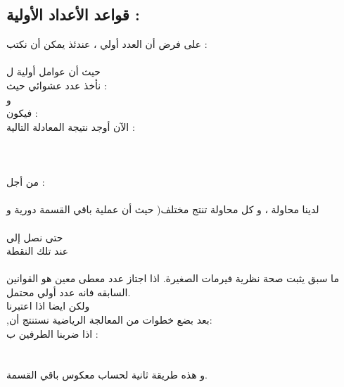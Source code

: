 \documentclass[11pt,a4paper]{report}
\begin{document}
\begin{otherlanguage}{arabic}
\chapter{قواعد الأعداد الأولية :}
\begin{otherlanguage}{arabic}
\begin{center}
على فرض أن العدد  أولي ، عندئذ يمكن أن نكتب :
\\
\textit{}
\\
حيث أن  عوامل أولية ل 
\\
نأخذ عدد عشوائي  حيث :
\\
  و 
\\
فيكون : 
\\
الآن أوجد نتيجة المعادلة التالية :
\\
\\
\\
\\
من أجل :
\\
\\
لدينا   محاولة ، و كل محاولة تنتج  مختلف( حيث أن عملية باقي القسمة دورية و 
\\
\\
 حتى نصل إلى
\\
عند تلك النقطة 
\\
\\
ما سبق يثبت صحة نظرية فيرمات الصغيرة.
اذا اجتاز عدد معطى معين هو  القوانين السابقه فانه عدد أولي محتمل.
\\
ولكن ايضا اذا اعتبرنا  
\\
,بعد بضع خطوات من المعالجة الرياضية نستنتج أن:
\\
اذا ضربنا الطرفين ب  :
\\
\\
\\
و هذه طريقة ثانية لحساب معكوس باقي القسمة.









\end{center}
\end{otherlanguage}
\end{otherlanguage}
\end{document}
